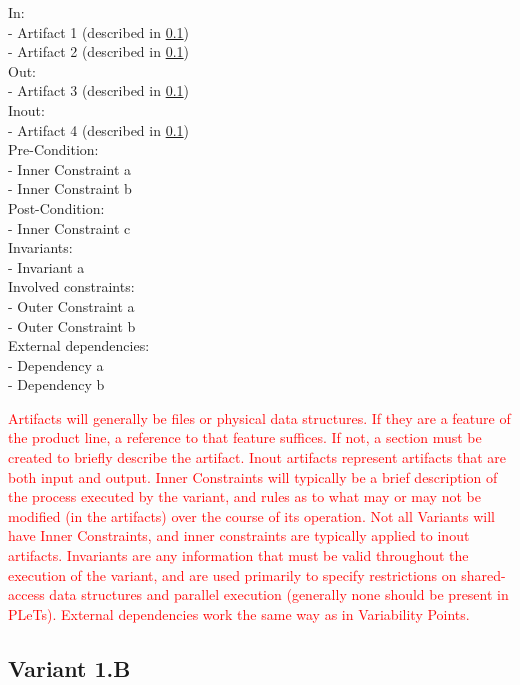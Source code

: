 \begin{listing}
In:
\\  - Artifact 1 (described in \ref{})
\\  - Artifact 2 (described in \ref{})
\\Out:
\\  - Artifact 3 (described in \ref{})
\\Inout:
\\  - Artifact 4 (described in \ref{})
\\Pre-Condition:
\\  - Inner Constraint a
\\  - Inner Constraint b
\\Post-Condition:
\\  - Inner Constraint c
\\Invariants:
\\  - Invariant a
\\Involved constraints:
\\  - Outer Constraint a
\\  - Outer Constraint b
\\External dependencies:
\\  - Dependency a
\\  - Dependency b
\caption{Variant 1.A Interface}
\end{listing}

\textcolor{red}{Artifacts will generally be files or physical data structures. If they are a feature of the product line, a reference to that feature suffices. If not, a section must be created to briefly describe the artifact. Inout artifacts represent artifacts that are both input and output. Inner Constraints will typically be a brief description of the process executed by the variant, and rules as to what may or may not be modified (in the artifacts) over the course of its operation. Not all Variants will have Inner Constraints, and inner constraints are typically applied to inout artifacts. Invariants are any information that must be valid throughout the execution of the variant, and are used primarily to specify restrictions on shared-access data structures and parallel execution (generally none should be present in PLeTs). External dependencies work the same way as in Variability Points.}


\subsection{Variant 1.B}

